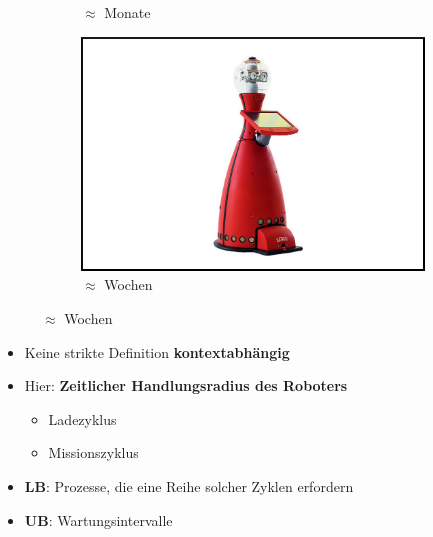 \documentclass{beamer}
\begin{document}
\begin{frame}
\begin{figure}[H]
\begin{subfigure}[b]{0.32\textwidth}
      \caption*{$\approx$ Monate \cite{WaveGlider}}
    \end{subfigure}
    \begin{subfigure}[b]{0.32\textwidth}
      \centering
      \includegraphics[width=\textwidth]{img/service_robot.jpg}
      \caption*{$\approx$ Wochen \cite{ServiceRobot}}
    \end{subfigure}
  \end{figure}
  \begin{itemize}
    \item Keine strikte Definition \textrightarrow \thinspace \textbf{kontextabhängig}
    \item Hier: \textbf{Zeitlicher Handlungsradius des Roboters}
    \begin{itemize}
      \item Ladezyklus
      \item Missionszyklus
    \end{itemize}
    \item \textbf{LB}: Prozesse, die eine Reihe solcher Zyklen erfordern
    \item \textbf{UB}: Wartungsintervalle
  \end{itemize}
\end{frame}
\end{document}
